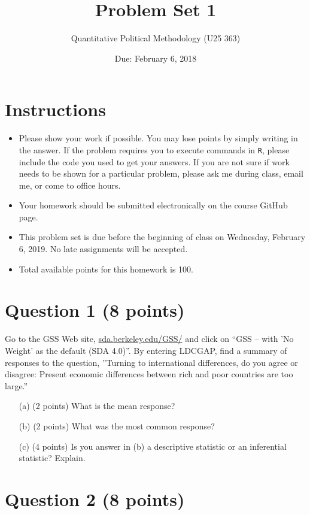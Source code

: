 \documentclass[12pt,letterpaper]{article}
\title{Problem Set 1}
\date{Due: February 6, 2018}
\author{Quantitative Political Methodology (U25 363)}
\begin{document}
	\maketitle
	
	\section*{Instructions}
	\begin{itemize}
		\item Please show your work if possible. You may lose points by simply writing in the answer. If the problem requires you to execute commands in \texttt{R}, please include the code you used to get your answers. If you are not sure if work needs to be shown for a particular problem, please ask me during class, email me, or come to office hours.
		\item Your homework should be submitted electronically on the course GitHub page.
		\item This problem set is due before the beginning of class on Wednesday, February 6, 2019. No late assignments will be accepted.
		\item Total available points for this homework is 100.
	\end{itemize}
	
	
	\section*{Question 1 (8 points)}
	
	Go to the GSS Web site,  \href{http://sda.berkeley.edu/GSS/}{sda.berkeley.edu/GSS/} and click on “GSS – with ’No Weight’ as the default (SDA 4.0)”. By entering LDCGAP, find a summary of responses to the question, ”Turning to international differences, do you agree or disagree: Present economic differences between rich and poor countries are too large.”
	\begin{itemize}
		\item[(a)] (2 points) What is the mean response?
		\item[(b)] (2 points) What was the most common response?
		\item[(c)] (4 points) Is you answer in (b) a descriptive statistic or an inferential statistic? Explain.
	\end{itemize}
	
	\section*{Question 2 (8 points)}
	
\end{document}
